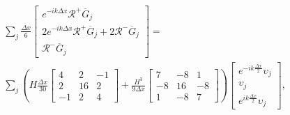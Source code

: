 \begin{multline*}
\sum_j \frac{\Delta x}{6} \begin{bmatrix} e^{-ik\Delta x} \mathcal{R}^+ \overline{G}_{j} \\2 e^{-ik\Delta x} \mathcal{R}^+\overline{G}_{j} +2 \mathcal{R}^- \overline{G}_{j}\\ \mathcal{R}^- \overline{G}_{j} \end{bmatrix} = \\\sum_j \left(H\frac{\Delta x}{30}\begin{bmatrix} 4 &2 &-1 \\2 &16 &2  \\-1 &2 &4 \end{bmatrix} + \frac{H^3 }{9\Delta x}\begin{bmatrix} 7 &-8 &1  \\-8 &16 &-8  \\1 &-8 &7  \end{bmatrix} \right) \begin{bmatrix} e^{-ik\frac{\Delta x}{2}}\upsilon_{j} \\\upsilon_{j} \\ e^{ik\frac{\Delta x}{2}}\upsilon_{j} \end{bmatrix},
\end{multline*}

